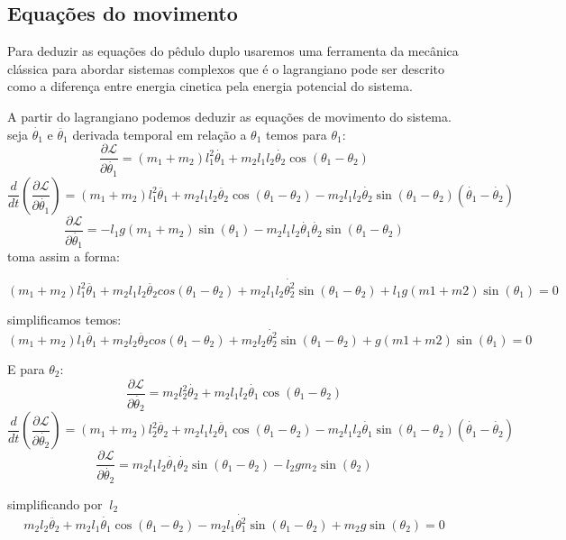 \documentclass[a4paper]{article} %
\begin{document}
\subsection{Equa\c{c}\~{o}es do movimento}

Para deduzir as equa\c{c}\~{o}es do p\^{e}dulo duplo usaremos uma ferramenta da mec\^{a}nica cl\'{a}ssica para abordar sistemas complexos que \'{e} o lagrangiano  pode ser descrito como a diferen\c{c}a entre energia cinetica pela energia potencial do sistema.

A partir do lagrangiano podemos deduzir as equa\c{c}\~{o}es de movimento do sistema.
seja $\dot{\theta_1}$ e $\ddot{\theta_1}$ derivada temporal em relação a $\theta_1$ temos para $\theta_1$:
\[\frac{\partial{\mathcal{L}}}{\partial \dot{\theta_1}} = (m_1+m_2)l_1^{2}\dot{\theta_1}+m_2l_1l_2\dot{\theta_2}\cos(\theta_1-\theta_2)\]
\[\frac{d}{dt}\left(\frac{\partial{\mathcal{L}}}{\partial{\dot{\theta_1}}}\right) = (m_1+m_2)l_1^{2}\ddot{\theta_1}+m_2l_1l_2\ddot{\theta_2}\cos(\theta_1-\theta_2) - m_2l_1l_2\dot{\theta_2}\sin(\theta_1-\theta_2)(\dot{\theta_1} - \dot{\theta_2})\]
\begin{equation}
	\frac{\partial{\mathcal{L}}}{\partial \dot{\theta_1}} = -l_1g(m_1+m_2)\sin(\theta_1) -m_2l_1l_2\dot{\theta_1}\dot{\theta_2}\sin(\theta_1-\theta_2)
\end{equation}
toma assim a forma:

\[(m_1+m_2)l_1^2\ddot{\theta_1} + m_2l_1l_2\ddot{\theta_2}cos(\theta_1 - \theta_2)+m_2l_1l_2\dot{\theta_2^{2}}\sin(\theta_1-\theta_2)+l_1g(m1+m2)\sin(\theta_1) = 0 \]

simplificamos temos:
\[(m_1+m_2)l_1\ddot{\theta_1} + m_2l_2\ddot{\theta_2}cos(\theta_1 - \theta_2)+m_2l_2\dot{\theta_2^{2}}\sin(\theta_1-\theta_2)+g(m1+m2)\sin(\theta_1) = 0 \]

E para $\theta_2$:
\[\frac{\partial{\mathcal{L}}}{\partial \dot{\theta_2}} = m_2l_2^{2}\dot{\theta_2}+m_2l_1l_2\dot{\theta_1}\cos(\theta_1-\theta_2)\]
\[\frac{d}{dt}\left(\frac{\partial{\mathcal{L}}}{\partial{\dot{\theta_2}}}\right) = (m_1+m_2)l_2^{2}\ddot{\theta_2}+m_2l_1l_2\ddot{\theta_1}\cos(\theta_1-\theta_2) - m_2l_1l_2\dot{\theta_1}\sin(\theta_1-\theta_2)(\dot{\theta_1} - \dot{\theta_2})\]
\[\frac{\partial{\mathcal{L}}}{\partial \dot{\theta_2}} = m_2l_1l_2\dot{\theta_1}\dot{\theta_2}\sin(\theta_1-\theta_2) -l_2gm_2\sin(\theta_2)\]

simplificando por $\ l_2$
\begin{equation}
	m_2l_2\ddot{\theta_2}+m_2l_1\dot{\theta_1}\cos(\theta_1-\theta_2) -m_2l_1\dot{\theta_1^{2}}\sin(\theta_1-\theta_2)+m_2g\sin(\theta_2) = 0  
\end{equation}
 
\end{document}
